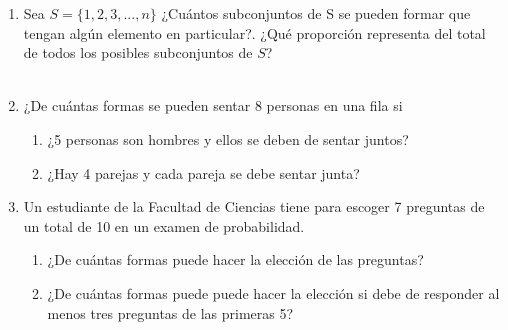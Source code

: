 \documentclass[12pt,a4paper]{report}
\begin{document}
\begin{enumerate}
{	}

   \item {
    Sea $S = \{1, 2, 3, ... , n\}$ ¿Cuántos subconjuntos de S se pueden
    formar que tengan algún elemento en particular?. ¿Qué proporción
    representa del total de todos los posibles subconjuntos de $S$?\\\\
	
	}

   \item {
    ¿De cuántas formas se pueden sentar 8 personas en una fila si\\

	\begin{enumerate}
   \item {
   ¿5 personas son hombres y ellos se deben de sentar juntos?\\
   
   }
   
   \item {
   ¿Hay 4 parejas y cada pareja se debe sentar junta?\\
   
   }
	
	\end{enumerate}
        
    }

   \item {
    Un estudiante de la Facultad de Ciencias tiene para escoger 7 preguntas
    de un total de 10 en un examen de probabilidad.\\

	\begin{enumerate}
   \item {
   ¿De cuántas formas puede hacer la elección de las preguntas?\\
   
   }
   
   \item {
   ¿De cuántas formas puede puede hacer la elección si debe de responder
   al menos tres preguntas de las primeras 5?\\
          
   }
	\end{enumerate}
    }
\end{enumerate}
\end{document}
